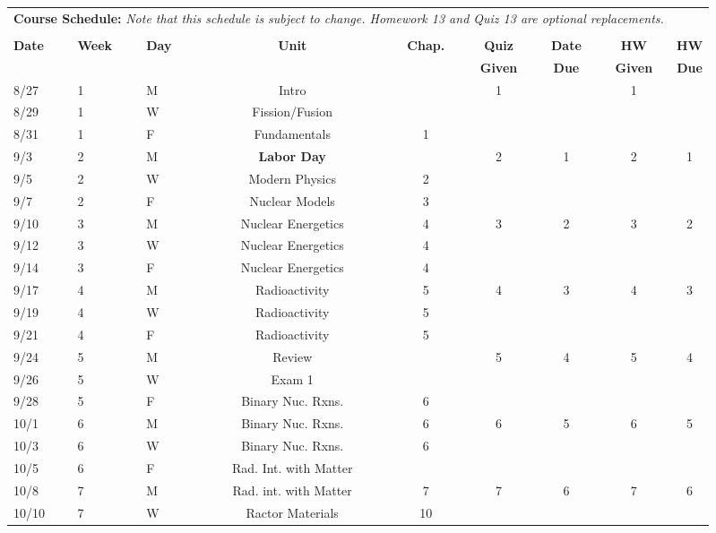 \documentclass[11pt, a4paper]{article}
\begin{document}
\pagebreak
\FloatBarrier
\renewcommand{\arraystretch}{1}
\begin{table}[h]
\begin{center}
\begin{tabular}{lllcccccc}
\multicolumn{8}{c}{\textbf{Course Schedule:}\textit{ Note that this schedule is 
subject to change. Homework 13 and Quiz 13 are optional replacements.}}\\
&&&&&&&&\\
\textbf{Date} & \textbf{Week} & \textbf{Day} & \textbf{Unit} & \textbf{Chap.} & \textbf{Quiz}& \textbf{Date} & \textbf{HW} & \textbf{HW}\\
              &  &  &  &  & \textbf{Given} & \textbf{Due} & \textbf{Given} & \textbf{Due}\\ \hline
\hline
8/27 & 1 & M  & Intro &  & 1 &  & 1 & \\
8/29 & 1 & W & Fission/Fusion &  &  &  &  &  \\
8/31 & 1 & F & Fundamentals & 1 &  &  &  &  \\
9/3 & 2 & M & \textbf{Labor Day}  &  & 2 & 1 & 2 & 1 \\
9/5 & 2 & W & Modern Physics  & 2 &  &  &  &  \\
9/7 & 2 & F & Nuclear Models  & 3 &  &  &  &  \\
9/10 & 3 & M & Nuclear Energetics  & 4 & 3 & 2 & 3 & 2 \\
9/12 & 3 & W & Nuclear Energetics  & 4 &  &  &  &  \\
9/14 & 3 & F & Nuclear Energetics  & 4 &  &  &  &  \\
9/17 & 4 & M & Radioactivity  & 5 & 4 & 3 & 4 & 3 \\
9/19 & 4 & W & Radioactivity  & 5 &  &  &  &  \\
9/21 & 4 & F & Radioactivity  & 5 &  &  &  &  \\
9/24 & 5 & M & Review  &  & 5 & 4 & 5 & 4 \\
9/26 & 5 & W & Exam 1  &  &  &  &  &  \\
9/28 & 5 & F & Binary Nuc. Rxns.  & 6 &  &  &  &  \\
10/1 & 6 & M & Binary Nuc. Rxns.  & 6 & 6 & 5 & 6 & 5 \\
10/3 & 6 & W & Binary Nuc. Rxns.  & 6 &  &  &  &  \\
10/5 & 6 & F & Rad. Int. with Matter  &  &  &  &  &  \\
10/8 & 7 & M & Rad. int. with Matter & 7 & 7 & 6 & 7 & 6 \\
10/10 & 7 & W & Ractor Materials  & 10 &  &  &  &  \\

\end{tabular}
\end{center}
\end{table}
\end{document}
